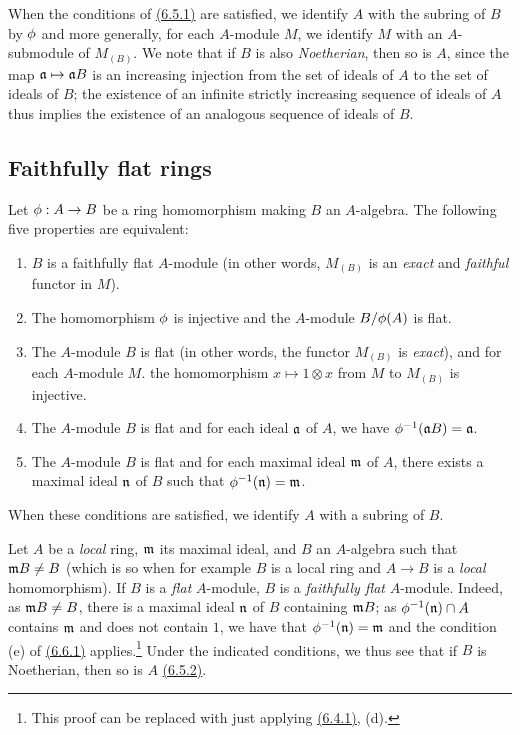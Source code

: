 \begin{env}[6.5.2]
\label{0.6.5.2}
When the conditions of \hyperref[0.6.5.1]{(6.5.1)} are satisfied, we identify $A$ with the subring of
$B$ by $\phi$ and more generally, for each $A$-module $M$, we identify $M$ with an
$A$-submodule of $M_{(B)}$. We note that if $B$ is also {\em Noetherian}, then so is $A$,
since the map $\mathfrak{a}\mapsto\mathfrak{a}B$ is an increasing injection from the set of
ideals of $A$ to the set of ideals of $B$; the existence of an infinite strictly increasing
sequence of ideals of $A$ thus implies the existence of an analogous sequence of ideals of
$B$.
\end{env}

\subsection{Faithfully flat rings}
\label{subsection-faithfullu-flat-rings}

\begin{env}[6.6.1]
\label{0.6.6.1}
Let $\phi:A\to B$ be a ring homomorphism making $B$ an $A$-algebra. The following five
properties are equivalent:
\begin{enumerate}[label=(\alph*)]
  \item $B$ is a faithfully flat $A$-module (in other words, $M_{(B)}$ is an {\em exact}
    and {\em faithful} functor in $M$).
  \item The homomorphism $\phi$ is injective and the $A$-module $B/\phi(A)$ is flat.
  \item The $A$-module $B$ is flat (in other words, the functor $M_{(B)}$ is {\em exact}),
    and for each $A$-module $M$. the homomorphism $x\mapsto 1\otimes x$ from $M$ to $M_{(B)}$ is
    injective.
  \item The $A$-module $B$ is flat and for each ideal $\mathfrak{a}$ of $A$, we have
    $\phi^{-1}(\mathfrak{a}B)=\mathfrak{a}$.
  \item The $A$-module $B$ is flat and for each maximal ideal $\mathfrak{m}$ of $A$, there
    exists a maximal ideal $\mathfrak{n}$ of $B$ such that $\phi^{-1}(\mathfrak{n})=\mathfrak{m}$.
\end{enumerate}

When these conditions are satisfied, we identify $A$ with a subring of $B$.
\end{env}

\begin{env}[6.6.2]
\label{0.6.6.2}
Let $A$ be a {\em local} ring, $\mathfrak{m}$ its maximal ideal, and $B$ an $A$-algebra such
that $\mathfrak{m}B\neq B$ (which is so when for example $B$ is a local ring and $A\to B$ is
a {\em local} homomorphism). If $B$ is a {\em flat} $A$-module, $B$ is a {\em faithfully
flat} $A$-module. Indeed, as $\mathfrak{m}B\neq B$, there is a maximal ideal $\mathfrak{n}$
of $B$ containing $\mathfrak{m}B$; as $\phi^{-1}(\mathfrak{n})\cap A$ contains
$\mathfrak{m}$ and does not contain $1$, we have that $\phi^{-1}(\mathfrak{n})=\mathfrak{m}$
and the condition (e) of \hyperref[0.6.6.1]{(6.6.1)} applies.\footnote{This proof can be
replaced with just applying \hyperref[0.6.4.1]{(6.4.1)}, (d).} Under the indicated
conditions, we thus see that if $B$ is Noetherian, then so is
$A$ \hyperref[0.6.5.2]{(6.5.2)}.
\end{env}

